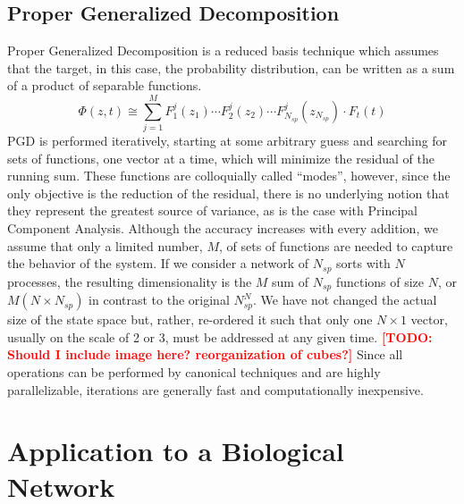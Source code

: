 \documentclass{article}
\newcommand{\lighttodo}[1]{\textcolor{red}{#1}}
\newcommand{\todo}[1]{\lighttodo{\textbf{[TODO: #1]}}}
\begin{document}
\subsection{Proper Generalized Decomposition}\label{PGD}
Proper Generalized Decomposition \cite{chinesta2011overview,chinesta2013pgd} is a reduced basis technique which assumes that the target, in this case, the probability distribution, can be written as a sum of a product of separable functions.
\[
 \Phi(z,t)\cong \sum_{j=1}^{M}F_1^j(z_1)\cdots F_2^j(z_2)\cdots F_{N_{sp}}^j(z_{N_{sp}}) \cdot F_t(t)
\]
PGD is performed iteratively, starting at some arbitrary guess and searching for sets of functions, one vector at a time, which will minimize the residual of the running sum. These functions are colloquially called ``modes'', however, since the only objective is the reduction of the residual, there is no underlying notion that they represent the greatest source of variance, as is the case with Principal Component Analysis. Although the accuracy increases with every addition, we assume that only a limited number, $M$, of sets of functions are needed to capture the behavior of the system. If we consider a network of $N_{sp}$ sorts with $N$ processes, the resulting dimensionality is the $M$ sum of $N_{sp}$ functions of size $N$, or $M(N\times N_{sp})$ in contrast to the original $N_{sp}^N$. We have not changed the actual size of the state space but, rather, re-ordered it such that only one $N\times1$ vector, usually on the scale of 2 or 3, must be addressed at any given time. \todo{Should I include image here? reorganization of cubes?} Since all operations can be performed by canonical techniques and are highly parallelizable, iterations are generally fast and computationally inexpensive.

\section{Application to a Biological Network}\label{bio_application}
\end{document}
